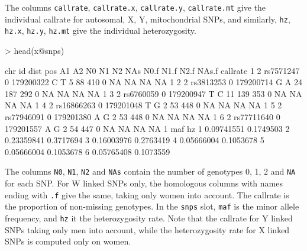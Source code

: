 \documentclass{article}
\renewenvironment{Schunk}{\vspace{\topsep}}{\vspace{\topsep}}
\begin{document}
The columns \verb!callrate!, \verb!callrate.x!, \verb!callrate.y!, \verb!callrate.mt!
give the individual callrate for autosomal, X, Y, mitochondrial SNPs, and similarly,
\verb!hz!, \verb!hz.x!, \verb!hz.y!, \verb!hz.mt! give the individual heterozygosity.

\begin{Schunk}
\begin{Sinput}
> head(x@snps)
\end{Sinput}
\begin{Soutput}
  chr         id dist       pos A1 A2 N0  N1  N2 NAs N0.f N1.f N2.f NAs.f callrate
1   2  rs7571247    0 179200322  C  T  5  88 410   0   NA   NA   NA    NA        1
2   2  rs3813253    0 179200714  G  A 24 187 292   0   NA   NA   NA    NA        1
3   2  rs6760059    0 179200947  T  C 11 139 353   0   NA   NA   NA    NA        1
4   2 rs16866263    0 179201048  T  G  2  53 448   0   NA   NA   NA    NA        1
5   2 rs77946091    0 179201380  A  G  2  53 448   0   NA   NA   NA    NA        1
6   2 rs77711640    0 179201557  A  G  2  54 447   0   NA   NA   NA    NA        1
         maf        hz
1 0.09741551 0.1749503
2 0.23359841 0.3717694
3 0.16003976 0.2763419
4 0.05666004 0.1053678
5 0.05666004 0.1053678
6 0.05765408 0.1073559
\end{Soutput}
\end{Schunk}

  The columns \verb!N0!, \verb!N1!, \verb!N2! and \verb!NAs! contain the number
  of genotypes 0, 1, 2 and \verb!NA! for each SNP. For W linked SNPs only, the 
  homologous columns with names ending with \verb!.f! give the same, taking only 
  women into account.
  The callrate is the proportion of non-missing
  genotypes. In the \verb!snps! slot, \verb!maf! is the minor allele frequency, and 
  \verb!hz! it the heterozygosity rate. Note that the callrate for Y linked SNPs
  taking only men into account, while the heterozygosity rate for X linked SNPs
  is computed only on women.
\end{document}
